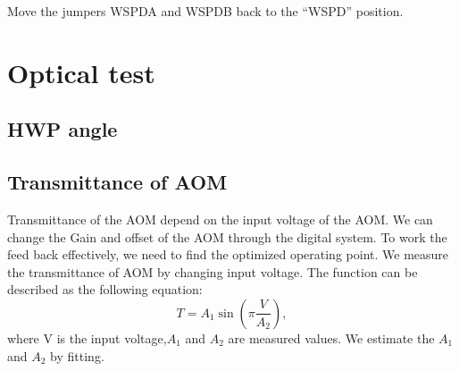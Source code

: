 \begin{enumerate}
\begin{enumerate}
		\begin{center}
		\end{center}
		Move the jumpers WSPDA and WSPDB back to the “WSPD” position.
	\end{enumerate}
\end{enumerate}

\section{Optical test}
\subsection{HWP angle}
\subsection{Transmittance of AOM}
Transmittance of the AOM depend on the input voltage of the AOM. We can change the Gain and offset of the AOM through the digital system. To work the feed back effectively, we need to find the optimized operating point. We measure the transmittance of AOM by changing input voltage. The function can be described as the following equation:
\begin{equation}
T=A_1 \sin{\left( \pi \frac{V}{A_2}\right)},
\end{equation}
where V is the input voltage,$ A_1$ and $A_2$ are measured values. We estimate the $A_1$ and $A_2$ by fitting.
			\begin{center}
                                                   \end{center}

